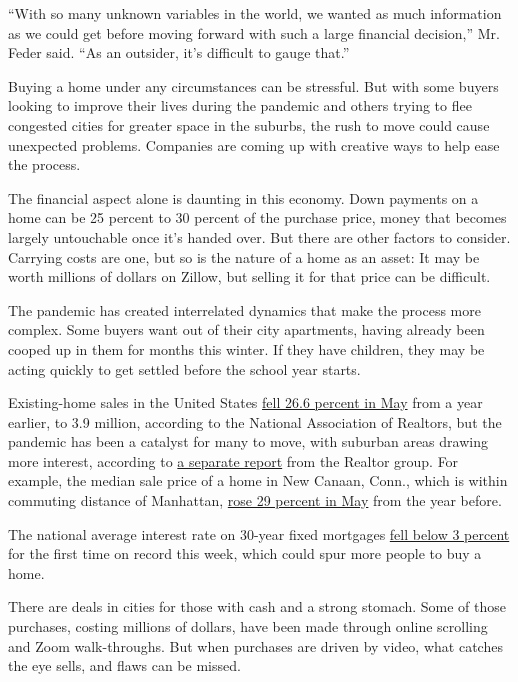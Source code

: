 ``With so many unknown variables in the world, we wanted as much
information as we could get before moving forward with such a large
financial decision,'' Mr. Feder said. ``As an outsider, it's difficult
to gauge that.''

Buying a home under any circumstances can be stressful. But with some
buyers looking to improve their lives during the pandemic and others
trying to flee congested cities for greater space in the suburbs, the
rush to move could cause unexpected problems. Companies are coming up
with creative ways to help ease the process.

The financial aspect alone is daunting in this economy. Down payments on
a home can be 25 percent to 30 percent of the purchase price, money that
becomes largely untouchable once it's handed over. But there are other
factors to consider. Carrying costs are one, but so is the nature of a
home as an asset: It may be worth millions of dollars on Zillow, but
selling it for that price can be difficult.

The pandemic has created interrelated dynamics that make the process
more complex. Some buyers want out of their city apartments, having
already been cooped up in them for months this winter. If they have
children, they may be acting quickly to get settled before the school
year starts.

Existing-home sales in the United States
\href{https://www.nar.realtor/newsroom/existing-home-sales-fall-9-7-in-may-while-nar-expects-strong-rebound-in-coming-months}{fell
26.6 percent in May} from a year earlier, to 3.9 million, according to
the National Association of Realtors, but the pandemic has been a
catalyst for many to move, with suburban areas drawing more interest,
according to
\href{https://www.nar.realtor/sites/default/files/documents/2020-market-recovery-survey-07-09-2020.pdf}{a
separate report} from the Realtor group. For example, the median sale
price of a home in New Canaan, Conn., which is within commuting distance
of Manhattan,
\href{https://newcanaanite.com/new-canaan-home-sales-median-price-up-29-in-may-3046583}{rose
29 percent in May} from the year before.

The national average interest rate on 30-year fixed mortgages
\href{https://www.nytimes3xbfgragh.onion/2020/07/16/business/mortgage-rates-below-3-percent.html}{fell
below 3 percent} for the first time on record this week, which could
spur more people to buy a home.

There are deals in cities for those with cash and a strong stomach. Some
of those purchases, costing millions of dollars, have been made through
online scrolling and Zoom walk-throughs. But when purchases are driven
by video, what catches the eye sells, and flaws can be missed.

